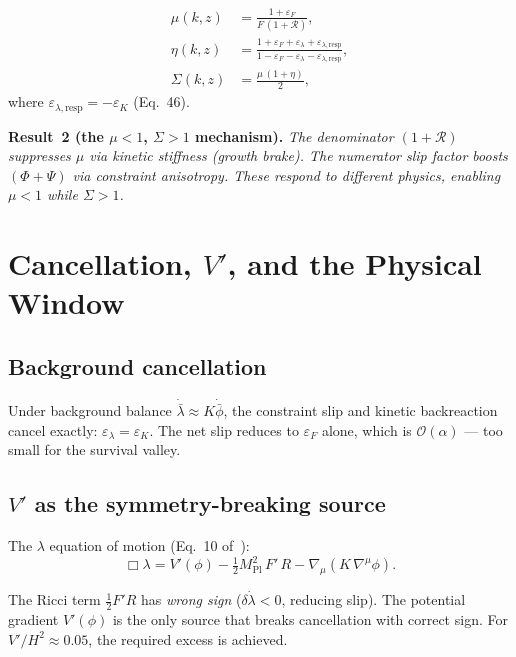 \documentclass[11pt,a4paper]{article}
\begin{document}
\begin{align}
\mu(k,z) &= \frac{1 + \varepsilon_F}{F\,(1 + \mathcal{R})}, \label{eq:mu_efc}\\[4pt]
\eta(k,z) &= \frac{1 + \varepsilon_F + \varepsilon_\lambda + \varepsilon_{\lambda,\mathrm{resp}}}
  {1 - \varepsilon_F - \varepsilon_\lambda - \varepsilon_{\lambda,\mathrm{resp}}},
  \label{eq:eta_efc}\\[4pt]
\Sigma(k,z) &= \frac{\mu\,(1+\eta)}{2}, \label{eq:sigma_efc}
\end{align}
where $\varepsilon_{\lambda,\mathrm{resp}} = -\varepsilon_K$ (Eq.~46).

\textbf{Result~2 (the $\mu < 1$, $\Sigma > 1$ mechanism).}
\emph{The denominator $(1+\mathcal{R})$ suppresses $\mu$ via kinetic
stiffness (growth brake).  The numerator slip factor boosts
$(\Phi+\Psi)$ via constraint anisotropy.  These respond to different
physics, enabling $\mu < 1$ while $\Sigma > 1$.}

\newpage
\section{Cancellation, $V'$, and the Physical Window}

\subsection{Background cancellation}

Under background balance $\dot{\bar\lambda} \approx K\dot{\bar\phi}$,
the constraint slip and kinetic backreaction cancel exactly:
$\varepsilon_\lambda = \varepsilon_K$.  The net slip reduces to
$\varepsilon_F$ alone, which is $\mathcal{O}(\alpha)$ --- too small
for the survival valley.

\subsection{$V'$ as the symmetry-breaking source}

The $\lambda$ equation of motion (Eq.~10 of~\cite{magnusson2026action}):
\begin{equation}
\Box\lambda = V'(\phi) - \tfrac{1}{2}M_{\mathrm{Pl}}^2\,F'\,R
  - \nabla_\mu(K\,\nabla^\mu\phi).
\end{equation}

The Ricci term $\frac{1}{2}F'R$ has \emph{wrong sign}
($\delta\dot\lambda < 0$, reducing slip).  The potential gradient
$V'(\phi)$ is the only source that breaks cancellation with correct
sign.  For $V'/H^2 \approx 0.05$, the required excess is achieved.
\end{document}

